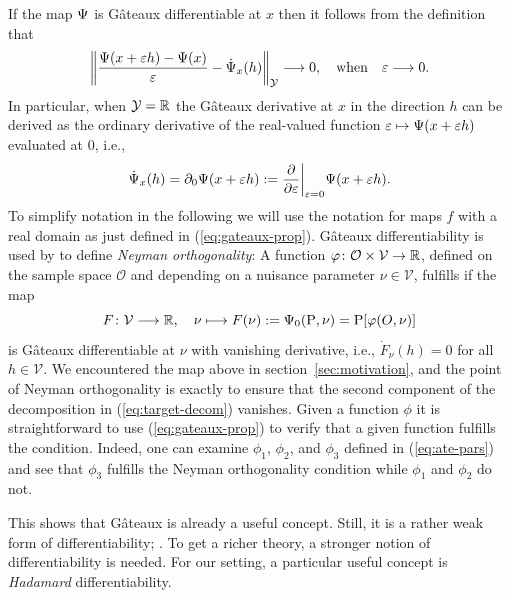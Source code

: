 \documentclass[a4,danish]{article}
\begin{document}
If the map $\operatorname{\Psi}$ is Gâteaux differentiable at $x$ then it follows from the definition that
\begin{equation}
  \label{eq:1}
    \left\Vert
      \frac{\operatorname{\Psi}(x + \varepsilon h) - \operatorname{\Psi}(x)}{\varepsilon} - \dot{\operatorname{\Psi}}_x(h)
    \right\Vert_{\mathcal{Y}} \longrightarrow 0,
    \quad \text{when} \quad \varepsilon \longrightarrow 0.
\end{equation}
In particular, when $\mathcal{Y} = \mathbb{R}$ the Gâteaux derivative at $x$ in the direction $h$ can be
derived as the ordinary derivative of the real-valued function
$\varepsilon \mapsto \operatorname{\Psi}(x + \varepsilon h)$ evaluated at 0, i.e.,
\begin{equation}
  \label{eq:gateaux-prop}
  \dot{\operatorname{\Psi}}_x(h) = \partial_0{\operatorname{\Psi}(x + \varepsilon h)}
  := \frac{\partial}{\partial \varepsilon} \bigg \vert_{\varepsilon=0}{\operatorname{\Psi}(x + \varepsilon h)}.
\end{equation}
To simplify notation in the following we will use the notation  for maps $f$ with a real domain as just defined in
(\ref{eq:gateaux-prop}). Gâteaux differentiability is used by \cite{chernozhukov2018double} to
define \textit{Neyman orthogonality}: A function
$\varphi \colon \mathcal{O} \times \mathcal{V}\rightarrow \mathbb{R}$, defined on the sample space
$\mathcal{O}$ and depending on a nuisance parameter $\nu \in \mathcal{V}$, fulfills  if the map
\begin{equation*}
  F \colon \mathcal{V} \longrightarrow \mathbb{R}, \quad \nu \longmapsto F(\nu) :=  \operatorname{\Psi}_0(\mathrm{{P}}, \nu) =\mathrm{{P}}[\varphi(O, \nu)]
\end{equation*}
is Gâteaux differentiable at $\nu$ with vanishing derivative, i.e., $\dot{F}_{\nu}(h) = 0$ for all
$h \in \mathcal{V}$. We encountered the map above in section~\ref{sec:motivation}, and the point of
Neyman orthogonality is exactly to ensure that the second component of the decomposition in
(\ref{eq:target-decom}) vanishes. Given a function $\phi$ it is straightforward to use
(\ref{eq:gateaux-prop}) to verify that a given function fulfills the condition. Indeed, one can
examine $\phi_1$, $\phi_2$, and $\phi_3$ defined in (\ref{eq:ate-pars}) and see that $\phi_3$
fulfills the Neyman orthogonality condition while $\phi_1$ and $\phi_2$ do not.

This shows that Gâteaux is already a useful concept. Still, it is a rather weak form of
differentiability; . To get a richer theory, a stronger
notion of differentiability is needed. For our setting, a particular useful concept is
\textit{Hadamard} differentiability.
\end{document}
